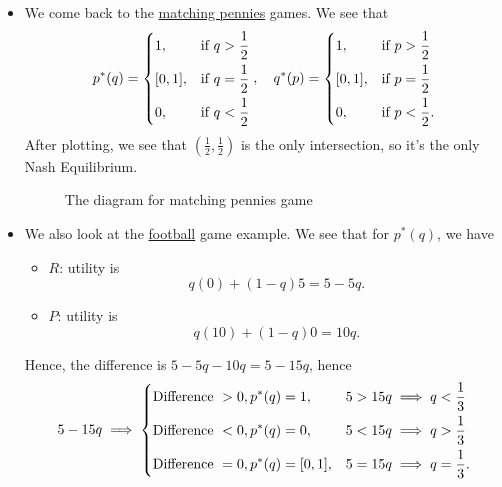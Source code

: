\begin{itemize}
	\item We come back to the \hyperref[matching-pennies]{matching pennies} games. We see that
	      \[
		      p^{\ast}(q) = \begin{dcases}
			      1,      & \text{if } q > \frac{1}{2} \\
			      [0, 1], & \text{if } q = \frac{1}{2} \\
			      0,      & \text{if } q < \frac{1}{2}
		      \end{dcases}, \quad q^{\ast}(p) = \begin{dcases}
			      1,      & \text{if } p > \frac{1}{2}  \\
			      [0, 1], & \text{if } p = \frac{1}{2}  \\
			      0,      & \text{if } p < \frac{1}{2}.
		      \end{dcases}
	      \]
	      After plotting, we see that \((\frac{1}{2}, \frac{1}{2})\) is the only intersection, so it's the only Nash Equilibrium.

	      \begin{figure}[H]
		      \centering
		      \caption{The diagram for matching pennies game}
		      \label{fig:NE-matching-pennies}
	      \end{figure}
	\item We also look at the \hyperref[football]{football} game example. We see that for \(p^{\ast}(q)\), we have
	      \begin{itemize}
		      \item \(R\): utility is
		            \[
			            q(0)+(1 - q)5 = 5 - 5q.
		            \]
		      \item \(P\): utility is
		            \[
			            q(10)+(1 - q)0 = 10q.
		            \]
	      \end{itemize}
	      Hence, the difference is \(5 - 5q-10q  = 5 - 15q\), hence
	      \[
		      5 - 15q \implies \begin{dcases}
			      \text{Difference }> 0, p^{\ast}(q) = 1,     & 5>15q \implies q<\frac{1}{3}  \\
			      \text{Difference }< 0, p^{\ast}(q) = 0,     & 5<15q \implies q>\frac{1}{3}  \\
			      \text{Difference }= 0, p^{\ast}(q) = [0,1], & 5=15q \implies q=\frac{1}{3}.
		      \end{dcases}
	      \]


\end{itemize}
